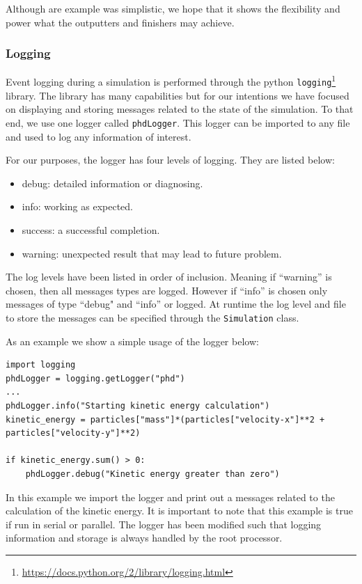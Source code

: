 Although are example was simplistic, we hope that it shows the flexibility and power
what the outputters and finishers may achieve.  

\subsubsection{Logging}
\label{sec.logging}
Event logging during a simulation is performed through the python 
\texttt{logging}\footnote{\url{https://docs.python.org/2/library/logging.html}} library. The library has 
many capabilities but for our intentions we have focused on displaying and storing messages related to the
state of the simulation. To that end, we use one logger called \lstinline{phdLogger}. This 
logger can be imported to any file and used to log any information of interest.

For our purposes, the logger has four levels of logging. They are listed below:
\begin{itemize}
	\item debug: detailed information or diagnosing.
    \item info: working as expected.
    \item success: a successful completion. 
    \item warning: unexpected result that may lead to future problem.
\end{itemize}
The log levels have been listed in order of inclusion. Meaning if ``warning'' is chosen, then all messages
types are logged. However if ``info'' is chosen only messages of type ``debug" and ``info'' or logged.
At runtime the log level and file to store the messages can be specified through the 
\lstinline{Simulation} class.

As an example we show a simple usage of the logger below:
\begin{lstlisting}
import logging
phdLogger = logging.getLogger("phd")
...
phdLogger.info("Starting kinetic energy calculation")
kinetic_energy = particles["mass"]*(particles["velocity-x"]**2 + particles["velocity-y"]**2)

if kinetic_energy.sum() > 0:
	phdLogger.debug("Kinetic energy greater than zero")
\end{lstlisting}
In this example we import the logger and print out a messages related to the calculation of the
kinetic energy. It is important to note that this example is true if run in serial or parallel. The logger
has been modified such that logging information and storage is always handled by the root processor.

